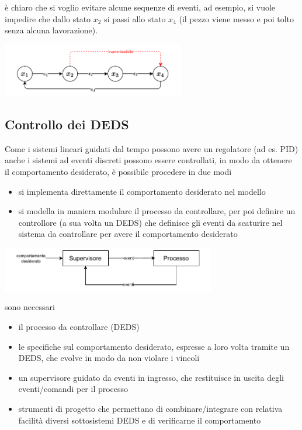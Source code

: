 \documentclass[10pt, letterpaper]{report}
\begin{document}
è chiaro che si voglio evitare alcune sequenze di eventi, ad esempio, si vuole impedire che dallo stato $x_2$ si passi allo stato $x_4$ (il pezzo viene messo e poi tolto senza alcuna lavorazione).\begin{center}
    \includegraphics[width=0.6\textwidth]{images/pressa.drawio.pdf}
\end{center}
\subsection{Controllo dei DEDS}
Come i sistemi lineari guidati dal tempo possono avere un regolatore (ad es. PID) anche i sistemi ad eventi discreti possono essere controllati, in modo da ottenere il comportamento desiderato, è possibile procedere in due modi\begin{itemize}
    \item si implementa direttamente il comportamento desiderato nel modello 
    \item si modella in maniera modulare il processo da controllare, per poi definire un controllore (a sua volta un DEDS) che definisce gli eventi da scaturire nel sistema da controllare per avere il comportamento desiderato
\end{itemize}
\begin{center}
    \includegraphics[width=0.7\textwidth]{images/controlloDEDS.pdf}
\end{center}
sono necessari\begin{itemize}
    \item il processo da controllare (DEDS)
    \item le specifiche sul comportamento desiderato, espresse a loro volta tramite un DEDS, che evolve in modo da non violare i vincoli 
    \item un supervisore guidato da eventi in ingresso, che restituisce in uscita degli eventi/comandi per il processo  
    \item strumenti di progetto che permettano di combinare/integrare con relativa facilità diversi
    sottosistemi DEDS e di verificarne il comportamento
\end{itemize}
\end{document}
